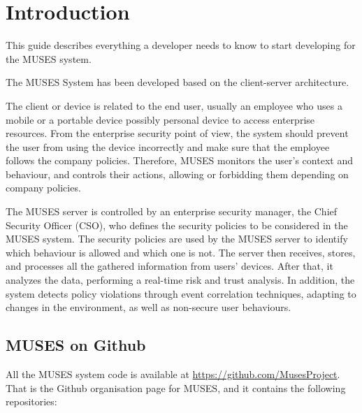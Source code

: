 \cleanlookdateon



\pagestyle{empty}

\titleGM %
\tableofcontents

\chapter{Introduction}
\label{ch:intro}

This guide describes everything a developer needs to know to start developing for the MUSES system.

The MUSES System \cite{deliverable21} has been developed based on the client-server architecture. 
 
The client or device is related to the end user, usually an employee who uses a mobile or a portable device possibly
personal device to access enterprise resources. From the enterprise security point of view, the system should prevent the user from using the device incorrectly and make sure that the employee follows the company policies. Therefore, MUSES monitors the user's context and behaviour, and controls their actions, allowing or forbidding them depending on company policies.

The MUSES server is controlled by an enterprise security manager, the Chief Security Officer (CSO), who defines the security policies to be considered in the MUSES system. The security policies are used by the MUSES server to identify which behaviour is allowed and which one is not. The server then receives, stores, and processes all the gathered information from users' devices. After that, it analyzes the data, performing a real-time risk and trust analysis. In addition, the system detects policy violations through event correlation techniques, adapting to changes in the environment, as well as non-secure user behaviours.

\section{MUSES on Github}
\label{sec:musesgit}

All the MUSES system code is available at \url{https://github.com/MusesProject}. That is the Github organisation page for MUSES, and it contains the following repositories:

